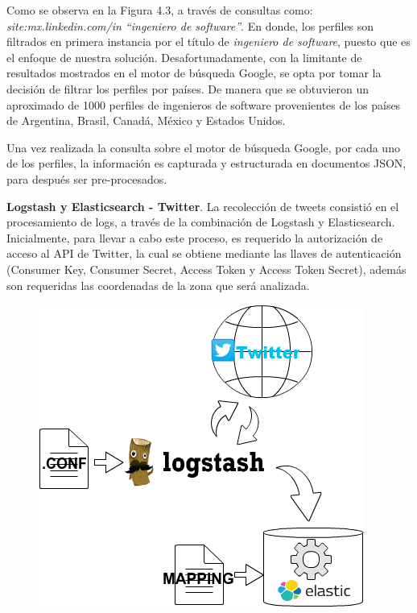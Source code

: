 Como se observa en la Figura 4.3, a través de consultas como: \textit{site:mx.linkedin.com/in “ingeniero de software”}. En donde, los perfiles son filtrados en primera instancia por el título de \textit{ingeniero de software}, puesto que es el enfoque de nuestra solución. Desafortunadamente, con la limitante de resultados mostrados en el motor de búsqueda Google, se opta por tomar la decisión de filtrar los perfiles por países. De manera que se obtuvieron un aproximado de 1000 perfiles de ingenieros de software provenientes de los países de Argentina, Brasil, Canadá, México y Estados Unidos.


Una vez realizada la consulta sobre el motor de búsqueda Google, por cada uno de los perfiles, la información es capturada y estructurada en documentos JSON, para después ser pre-procesados.


\textbf{Logstash y Elasticsearch - Twitter}. 
La recolección de tweets consistió en el procesamiento de logs, a través de la combinación de Logstash y Elasticsearch. Inicialmente, para llevar a cabo este proceso, es requerido la autorización de acceso al API de Twitter, la cual se obtiene mediante las llaves de autenticación (Consumer Key, Consumer Secret, Access Token y Access Token Secret), además son requeridas las coordenadas de la zona que será analizada.


\begin{figure}[H]
	\centering
	\includegraphics[height=0.24\textheight]{fig01/extraccion_tweet}
	\label{fig:RHP02}
\end{figure}

